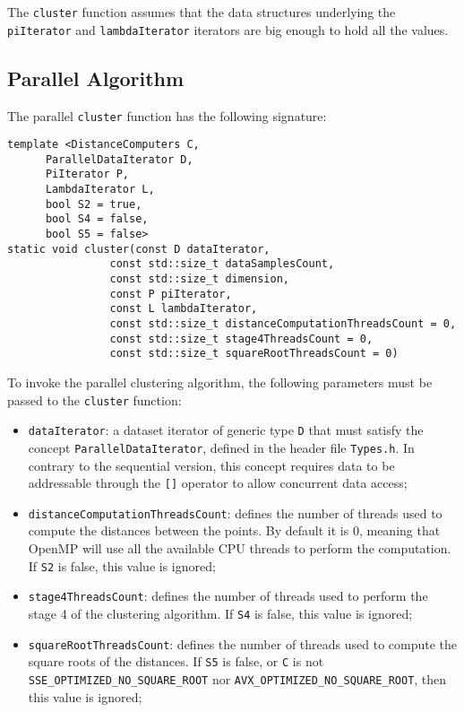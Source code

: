 \documentclass{article}
\begin{document}
The \texttt{cluster} function assumes that the data structures
underlying the \texttt{piIterator} and \texttt{lambdaIterator} iterators
are big enough to hold all the values.

\hypertarget{parallel-algorithm}{%
\subsection{Parallel Algorithm}\label{parallel-algorithm}}

The parallel \texttt{cluster} function has the following signature:

\begin{verbatim}
template <DistanceComputers C,
      ParallelDataIterator D,
      PiIterator P,
      LambdaIterator L,
      bool S2 = true,
      bool S4 = false,
      bool S5 = false>
static void cluster(const D dataIterator,
                const std::size_t dataSamplesCount,
                const std::size_t dimension,
                const P piIterator,
                const L lambdaIterator,
                const std::size_t distanceComputationThreadsCount = 0,
                const std::size_t stage4ThreadsCount = 0,
                const std::size_t squareRootThreadsCount = 0)
\end{verbatim}

To invoke the parallel clustering algorithm, the following parameters
must be passed to the \texttt{cluster} function:

\begin{itemize}
\item
  \texttt{dataIterator}: a dataset iterator of generic type \texttt{D}
  that must satisfy the concept \texttt{ParallelDataIterator}, defined
  in the header file \texttt{Types.h}. In contrary to the sequential
  version, this concept requires data to be addressable through the
  \texttt{{[}{]}} operator to allow concurrent data access;
\item
  \texttt{distanceComputationThreadsCount}: defines the number of
  threads used to compute the distances between the points. By default
  it is \(0\), meaning that OpenMP will use all the available CPU
  threads to perform the computation. If \texttt{S2} is false, this
  value is ignored;
\item
  \texttt{stage4ThreadsCount}: defines the number of threads used to
  perform the stage 4 of the clustering algorithm. If \texttt{S4} is
  false, this value is ignored;
\item
  \texttt{squareRootThreadsCount}: defines the number of threads used to
  compute the square roots of the distances. If \texttt{S5} is false, or
  \texttt{C} is not \texttt{SSE\_OPTIMIZED\_NO\_SQUARE\_ROOT} nor
  \texttt{AVX\_OPTIMIZED\_NO\_SQUARE\_ROOT}, then this value is ignored;
\end{itemize}
\end{document}
